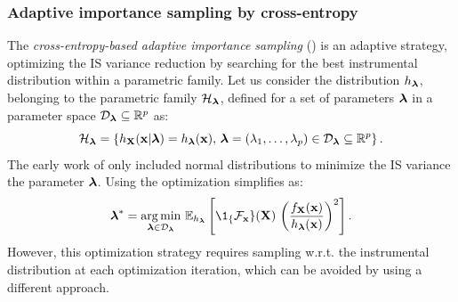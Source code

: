 \subsubsection{Adaptive importance sampling by cross-entropy}

The \textit{cross-entropy-based adaptive importance sampling} () is an adaptive strategy, optimizing the IS variance reduction by searching for the best instrumental distribution within a parametric family. 
Let us consider the distribution $h_{{\boldsymbol{\lambda}}}$, belonging to the parametric family $\mathcal{H}_{\boldsymbol{\lambda}}$, defined for a set of parameters ${\boldsymbol{\lambda}}$ in a parameter space $\mathcal{D}_{{\boldsymbol{\lambda}}} \subseteq \mathbb{R}^p$ as: 
\begin{equation}
    \mathcal{H}_{\boldsymbol{\lambda}} = \left\{h_{\bf X}({\bf x} | {\boldsymbol{\lambda}}) = h_{{\boldsymbol{\lambda}}}({\bf x}), \, {\boldsymbol{\lambda}} = (\lambda_1, \dots, \lambda_p) \in \mathcal{D}_{\boldsymbol{\lambda}} \subseteq \mathbb{R}^p\right\}.
\end{equation} 
The early work of \citet{bucher_1988_AIS} only included normal distributions to minimize the IS variance  the parameter ${\boldsymbol{\lambda}}$.
Using  the optimization simplifies as:
\begin{equation}
    \blambda^* = \argmin_{\blambda \in \iD_\blambda} \, \E_{h_\blambda}\left[ \1_\{\iF_\bx\}(\bX) \, \left(\frac{f_\bX(\bx)}{h_\blambda(\bx)}\right)^2 \right]. 
\end{equation}
However, this optimization strategy requires sampling w.r.t. the instrumental distribution at each optimization iteration, which can be avoided by using a different approach. 

